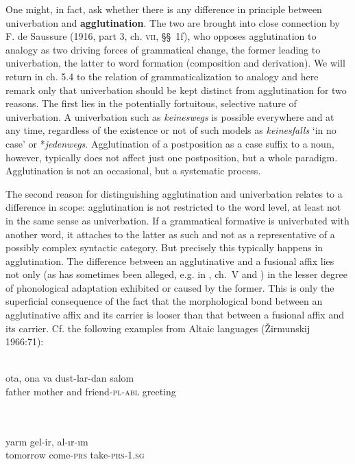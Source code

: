 One might, in fact, ask whether there is any difference in principle between univerbation and \textbf{agglutination}. The two are brought into close connection by F. de Saussure (1916, part 3, ch. \textsc{vii}, §§~1f), who opposes agglutination to analogy as two driving forces of grammatical change, the former leading to univerbation, the latter to word formation (composition and derivation). We will return in ch. 5.4 to the relation of grammaticalization to analogy and here remark only that univerbation should be kept distinct from agglutination for two reasons. The first lies in the potentially fortuitous, selective nature of univerbation. A univerbation such as \textit{keineswegs} is possible everywhere and at any time, regardless of the existence or not of such models as \textit{keinesfalls} ‘in no case’ or *\textit{jedenwegs}. Agglutination of a postposition as a case suffix to a noun, however, typically does not affect just one postposition, but a whole paradigm. Agglutination is not an occasional, but a systematic process.

The second reason for distinguishing agglutination and univerbation relates to a difference in scope: agglutination is not restricted to the word level, at least not in the same sense as univerbation. If a grammatical formative is univerbated with another word, it attaches to the latter as such and not as a representative of a possibly complex syntactic category. But precisely this typically happens in agglutination. The difference between an agglutinative and a fusional affix lies not only (as has sometimes been alleged, e.g. in \citet{Sapir1921}, ch.~V and \citet{Greenberg1954}) in the lesser degree of phonological adaptation exhibited or caused by the former. This is only the superficial consequence of the fact that the morphological bond between an agglutinative affix and its carrier is looser than that between a fusional affix and its carrier. Cf. the following examples from Altaic languages (Žirmunskij 1966:71):

\ea\label{ex:}
\langinfo{\LangUzb}{}{} \\
\gll ota,  ona  va  dust-lar-dan  salom\\
father  mother  and  friend-\textsc{pl}-\textsc{abl}  greeting\\
\\
\z

\ea\label{ex:}
\langinfo{\LangTurk}{}{} \\
\gll yarın  gel-ir,  al-ır-ım\\
tomorrow  come-\textsc{prs}  take-\textsc{prs}-1.\textsc{sg}\\
\\
\z

